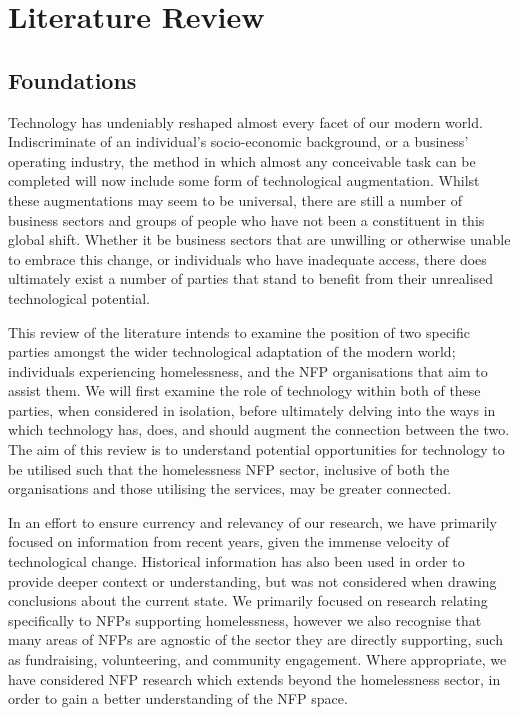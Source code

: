 \chapter{Literature Review}

\section{Foundations}

Technology has undeniably reshaped almost every facet of our modern world. Indiscriminate of an individual's socio-economic background, or a business' operating industry, the method in which almost any conceivable task can be completed will now include some form of technological augmentation. Whilst these augmentations may seem to be universal, there are still a number of business sectors and groups of people who have not been a constituent in this global shift. Whether it be business sectors that are unwilling or otherwise unable to embrace this change, or individuals who have inadequate access, there does ultimately exist a number of parties that stand to benefit from their unrealised technological potential.

This review of the literature intends to examine the position of two specific parties amongst the wider technological adaptation of the modern world; individuals experiencing homelessness, and the NFP organisations that aim to assist them. We will first examine the role of technology within both of these parties, when considered in isolation, before ultimately delving into the ways in which technology has, does, and should augment the connection between the two. The aim of this review is to understand potential opportunities for technology to be utilised such that the homelessness NFP sector, inclusive of both the organisations and those utilising the services, may be greater connected.

In an effort to ensure currency and relevancy of our research, we have primarily focused on information from recent years, given the immense velocity of technological change. Historical information has also been used in order to provide deeper context or understanding, but was not considered when drawing conclusions about the current state. We primarily focused on research relating specifically to NFPs supporting homelessness, however we also recognise that many areas of NFPs are agnostic of the sector they are directly supporting, such as fundraising, volunteering, and community engagement. Where appropriate, we have considered NFP research which extends beyond the homelessness sector, in order to gain a better understanding of the NFP space.

